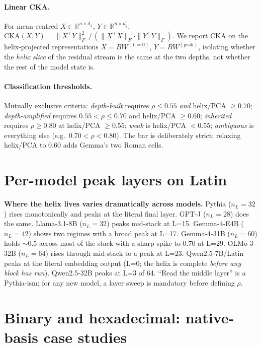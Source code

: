 \documentclass[10pt,letterpaper]{article}
\begin{document}
\paragraph{Linear CKA.} For mean-centred $X \in \mathbb{R}^{n \times d_x}$,
$Y \in \mathbb{R}^{n \times d_y}$,
$\mathrm{CKA}(X,Y) = \|X^\top Y\|_F^2 \,/\, (\|X^\top X\|_F \cdot \|Y^\top Y\|_F).$
We report CKA on the helix-projected representations
$X = B W^{(L\!=\!0)}$, $Y = B W^{(\text{peak})}$, isolating whether
the \emph{helix slice} of the residual stream is the same at the two
depths, not whether the rest of the model state is.

\paragraph{Classification thresholds.} Mutually exclusive criteria:
\emph{depth-built} requires $\rho \le 0.55$ \emph{and} helix/PCA $\ge 0.70$;
\emph{depth-amplified} requires $0.55 < \rho \le 0.70$ and helix/PCA
$\ge 0.60$; \emph{inherited} requires $\rho \ge 0.80$ at helix/PCA
$\ge 0.55$; \emph{weak} is helix/PCA $< 0.55$; \emph{ambiguous} is
everything else (e.g.\ $0.70 < \rho < 0.80$). The bar is deliberately
strict; relaxing helix/PCA to $0.60$ adds Gemma's two Roman cells.

\section{Per-model peak layers on Latin}
\label{app:layers}

\textbf{Where the helix lives varies dramatically across models.}
Pythia ($n_L = 32$) rises monotonically and peaks at the literal
final layer. GPT-J ($n_L = 28$) does the same. Llama-3.1-8B ($n_L
= 32$) peaks mid-stack at L=15. Gemma-4-E4B ($n_L = 42$) shows two
regimes with a broad peak at L=17. Gemma-4-31B ($n_L = 60$) holds
$\sim 0.5$ across most of the stack with a sharp spike to $0.70$ at
L=29. OLMo-3-32B ($n_L = 64$) rises through mid-stack to a peak at
L=23. Qwen2.5-7B/Latin peaks at the literal embedding output
(L=0; the helix is complete \emph{before any block has run}).
Qwen2.5-32B peaks at L=3 of 64. ``Read the middle layer'' is a
Pythia-ism; for any new model, a layer sweep is mandatory before
defining $\rho$.

\section{Binary and hexadecimal: native-basis case studies}
\label{app:bases}
\end{document}
